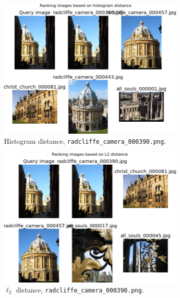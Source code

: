 \documentclass[a4paper,10pt,twoside]{article}
\begin{document}
\begin{figure}
\begin{subfigure}{0.47\textwidth}
    \centering
    \includegraphics[width=\textwidth]{ranking_h_r}
    \caption{Histogram distance, \texttt{radcliffe\_camera\_000390.png}.}
  \end{subfigure}
  \hspace*{\fill}
  \begin{subfigure}{0.47\textwidth}
    \centering
    \includegraphics[width=\textwidth]{ranking_l_r}
    \caption{$\ell_2$ distance, \texttt{radcliffe\_camera\_000390.png}.}
  \end{subfigure}
  \begin{subfigure}{0.47\textwidth}
    \centering

\end{subfigure}
\end{figure}
\end{document}
